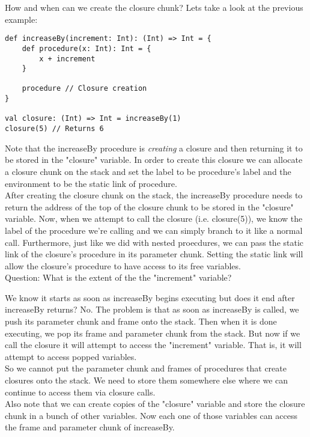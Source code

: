 \documentclass[12pt, letterpaper]{article}
\begin{document}
How and when can we create the closure chunk? Lets take a look at the previous example:
\begin{lstlisting}
def increaseBy(increment: Int): (Int) => Int = {
	def procedure(x: Int): Int = {
		x + increment
	}
	
	procedure // Closure creation
}

val closure: (Int) => Int = increaseBy(1)
closure(5) // Returns 6
\end{lstlisting}
Note that the increaseBy procedure is \emph{creating} a closure and then returning it to be stored in the "closure" variable. In order to create this closure we can allocate a closure chunk on the stack and set the label to be procedure's label and the environment to be the static link of procedure.\\

After creating the closure chunk on the stack, the increaseBy procedure needs to return the address of the top of the closure chunk to be stored in the "closure" variable. Now, when we attempt to call the closure (i.e. closure(5)), we know the label of the procedure we're calling and we can simply branch to it like a normal call. Furthermore, just like we did with nested proecdures, we can pass the static link of the closure's procedure in its parameter chunk. Setting the static link will allow the closure's procedure to have access to its free variables.\\

Question: What is the extent of the the "increment" variable?

We know it starts as soon as increaseBy begins executing but does it end after increaseBy returns? No. The problem is that as soon as increaseBy is called, we push its parameter chunk and frame onto the stack. Then when it is done executing, we pop its frame and parameter chunk from the stack. But now if we call the closure it will attempt to access the "increment" variable. That is, it will attempt to access popped variables.\\

So we cannot put the parameter chunk and frames of procedures that create closures onto the stack. We need to store them somewhere else where we can continue to access them via closure calls.\\

Also note that we can create copies of the "closure" variable and store the closure chunk in a bunch of other variables. Now each one of those variables can access the frame and parameter chunk of increaseBy.\\
\end{document}
